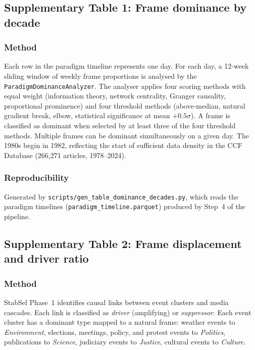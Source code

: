 
\subsection*{Supplementary Table 1: Frame dominance by decade}



\subsubsection*{Method}
Each row in the paradigm timeline represents one day. For each day, a 12-week sliding window of weekly frame proportions is analysed by the \texttt{ParadigmDominanceAnalyzer}. The analyser applies four scoring methods with equal weight (information theory, network centrality, Granger causality, proportional prominence) and four threshold methods (above-median, natural gradient break, elbow, statistical significance at mean $+ 0.5\sigma$). A frame is classified as dominant when selected by at least three of the four threshold methods. Multiple frames can be dominant simultaneously on a given day. The 1980s begin in 1982, reflecting the start of sufficient data density in the CCF Database (266,271 articles, 1978--2024).

\subsubsection*{Reproducibility}
Generated by \texttt{scripts/gen\_table\_dominance\_decades.py}, which reads the paradigm timelines (\texttt{paradigm\_timeline.parquet}) produced by Step~4 of the pipeline.


\newpage
\subsection*{Supplementary Table 2: Frame displacement and driver ratio}



\subsubsection*{Method}
StabSel Phase~1 identifies causal links between event clusters and media cascades. Each link is classified as \emph{driver} (amplifying) or \emph{suppressor}. Each event cluster has a dominant type mapped to a natural frame: weather events to \emph{Environment}, elections, meetings, policy, and protest events to \emph{Politics}, publications to \emph{Science}, judiciary events to \emph{Justice}, cultural events to \emph{Culture}.

